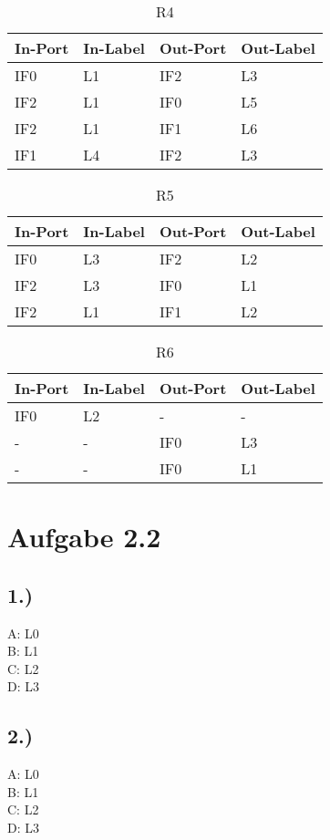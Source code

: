 \documentclass[a4paper]{scrartcl}
\begin{document}
\begin{table}[!htb]
\centering
\caption{R4}
\begin{tabular}{|l|l|l|l|}
\hline
In-Port & In-Label & Out-Port & Out-Label \\ \hline
IF0     & L1       & IF2      & L3        \\ \hline
IF2     & L1       & IF0      & L5        \\ \hline
IF2     & L1       & IF1      & L6        \\ \hline
IF1     & L4       & IF2      & L3        \\ \hline
\end{tabular}
\end{table}

\begin{table}[!htb]
\centering
\caption{R5}
\begin{tabular}{|l|l|l|l|}
\hline
In-Port & In-Label & Out-Port & Out-Label \\ \hline
IF0     & L3       & IF2      & L2        \\ \hline
IF2     & L3       & IF0      & L1        \\ \hline
IF2     & L1       & IF1      & L2        \\ \hline
\end{tabular}
\end{table}


\begin{table}[h]
\centering
\caption{R6}
\begin{tabular}{|l|l|l|l|}
\hline
In-Port & In-Label & Out-Port & Out-Label \\ \hline
IF0     & L2       & -        & -         \\ \hline
-       & -        & IF0      & L3        \\ \hline
-       & -        & IF0      & L1        \\ \hline
\end{tabular}
\end{table}
\newpage
\section*{Aufgabe 2.2}
\subsection*{1.)}
A: L0 \\
B: L1 \\
C: L2 \\
D: L3 
\subsection*{2.)}
A: L0 \\
B: L1 \\
C: L2 \\
D: L3 
\end{document}
